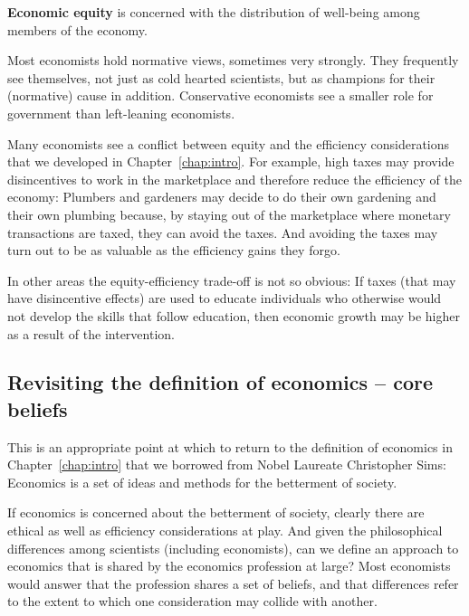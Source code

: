 \begin{DefBox}
\textbf{Economic equity} is concerned with the distribution of well-being among members of the economy.
\end{DefBox}

Most economists hold normative views, sometimes very strongly. They
frequently see themselves, not just as cold hearted scientists, but as
champions for their (normative) cause in addition. Conservative economists
see a smaller role for government than left-leaning economists. 

Many economists see a conflict between equity and the efficiency
considerations that we developed in Chapter~\ref{chap:intro}. For example,
high taxes may provide disincentives to work in the marketplace and
therefore reduce the efficiency of the economy: Plumbers and gardeners may
decide to do their own gardening and their own plumbing because, by staying
out of the marketplace where monetary transactions are taxed, they can avoid
the taxes. And avoiding the taxes may turn out to be as valuable as the
efficiency gains they forgo.

In other areas the equity-efficiency trade-off is not so obvious: If taxes
(that may have disincentive effects) are used to educate individuals who
otherwise would not develop the skills that follow education, then economic
growth may be higher as a result of the intervention.

\newhtmlpage

\subsection*{Revisiting the definition of economics -- core beliefs}

This is an appropriate point at which to return to the definition of
economics in Chapter~\ref{chap:intro} that we borrowed from Nobel Laureate
Christopher Sims: Economics is a set of ideas and methods for the betterment
of society.

If economics is concerned about the betterment of society, clearly there are
ethical as well as efficiency considerations at play. And given the
philosophical differences among scientists (including economists), can we
define an approach to economics that is shared by the economics profession
at large? Most economists would answer that the profession shares a set of
beliefs, and that differences refer to the extent to which one consideration
may collide with another.

